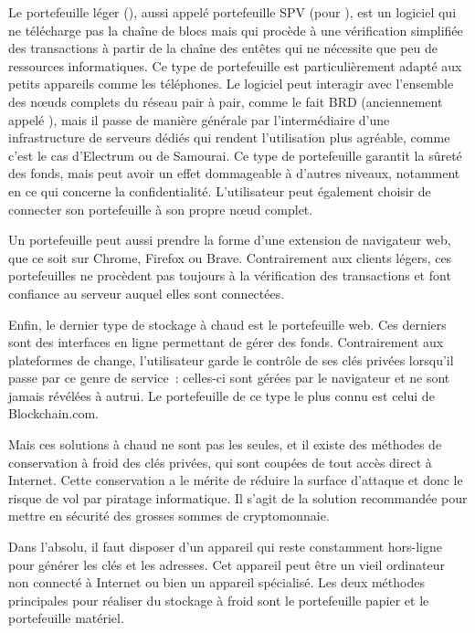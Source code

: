 Le portefeuille léger (), aussi appelé portefeuille SPV (pour ), est un logiciel qui ne télécharge pas la chaîne de blocs mais qui procède à une vérification simplifiée des transactions à partir de la chaîne des entêtes qui ne nécessite que peu de ressources informatiques. Ce type de portefeuille est particulièrement adapté aux petits appareils comme les téléphones. Le logiciel peut interagir avec l'ensemble des nœuds complets du réseau pair à pair, comme le fait BRD (anciennement appelé ), mais il passe de manière générale par l'intermédiaire d'une infrastructure de serveurs dédiés qui rendent l'utilisation plus agréable, comme c'est le cas d'Electrum ou de Samourai. Ce type de portefeuille garantit la sûreté des fonds, mais peut avoir un effet dommageable à d'autres niveaux, notamment en ce qui concerne la confidentialité. L'utilisateur peut également choisir de connecter son portefeuille à son propre nœud complet.

Un portefeuille peut aussi prendre la forme d'une extension de navigateur web, que ce soit sur Chrome, Firefox ou Brave. Contrairement aux clients légers, ces portefeuilles ne procèdent pas toujours à la vérification des transactions et font confiance au serveur auquel elles sont connectées.

Enfin, le dernier type de stockage à chaud est le portefeuille web. Ces derniers sont des interfaces en ligne permettant de gérer des fonds. Contrairement aux plateformes de change, l'utilisateur garde le contrôle de ses clés privées lorsqu'il passe par ce genre de service~: celles-ci sont gérées par le navigateur et ne sont jamais révélées à autrui. Le portefeuille de ce type le plus connu est celui de Blockchain.com.


Mais ces solutions à chaud ne sont pas les seules, et il existe des méthodes de conservation à froid des clés privées, qui sont coupées de tout accès direct à Internet. Cette conservation a le mérite de réduire la surface d'attaque et donc le risque de vol par piratage informatique. Il s'agit de la solution recommandée pour mettre en sécurité des grosses sommes de cryptomonnaie.

Dans l'absolu, il faut disposer d'un appareil qui reste constamment hors-ligne pour générer les clés et les adresses. Cet appareil peut être un vieil ordinateur non connecté à Internet ou bien un appareil spécialisé. Les deux méthodes principales pour réaliser du stockage à froid sont le portefeuille papier et le portefeuille matériel.

